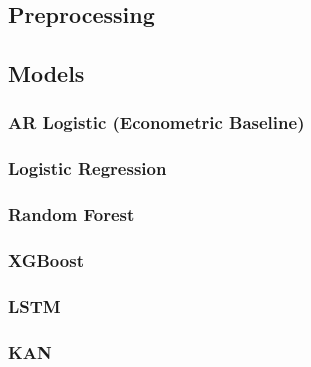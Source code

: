 \documentclass[12pt,a4paper,oneside]{article}
\begin{document}
\subsection{Preprocessing}\label{subsec:preprocessing}



\subsection{Models}\label{subsec:models}

\subsubsection{AR Logistic (Econometric Baseline)}\label{subsubsec:ar}

\subsubsection{Logistic Regression}\label{subsubsec:logistic}

\subsubsection{Random Forest}\label{subsubsec:rf}

\subsubsection{XGBoost}\label{subsubsec:xgboost}

\subsubsection{LSTM}\label{subsubsec:lstm}

\subsubsection{KAN}\label{subsubsec:kan}
\end{document}
